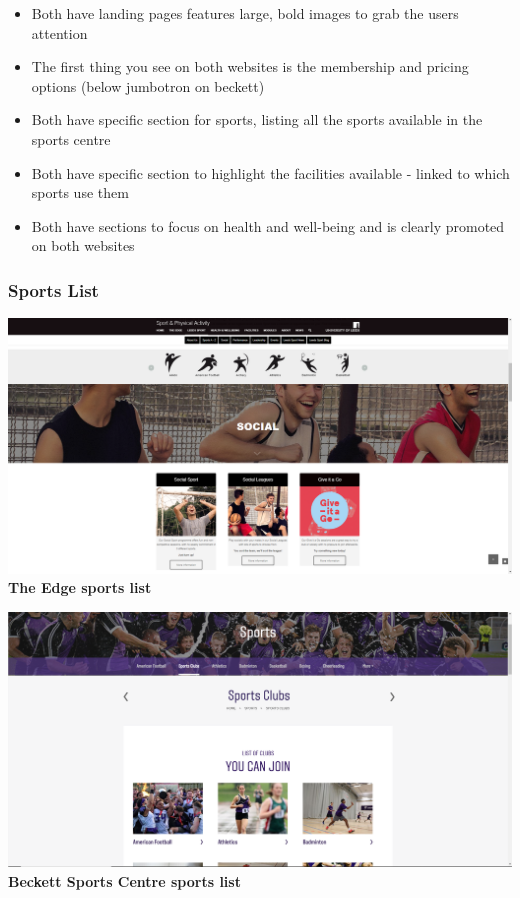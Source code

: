 \documentclass[12pt,a4paper]{article}
\begin{document}
\begin{itemize}
	\item Both have landing pages features large, bold images to grab the users attention
	
	\item The first thing you see on both websites is the membership and pricing options (below jumbotron on beckett)
	
	\item Both have specific section for sports, listing all the sports available in the sports centre
	
	\item Both have specific section to highlight the facilities available - linked to which sports use them 
	
	\item Both have sections to focus on health and well-being and is clearly promoted on both websites
\end{itemize}

\subsubsection{Sports List}
\begin{center}
	\includegraphics[width=0.7\linewidth]{img/edge-sports-list.png}\\
	 \textbf{The Edge sports list}
\end{center}

\begin{center}
	\includegraphics[width=0.7\linewidth]{img/beckett-sports-list.png}\\
	\textbf{Beckett Sports Centre sports list}
\end{center}
\end{document}
